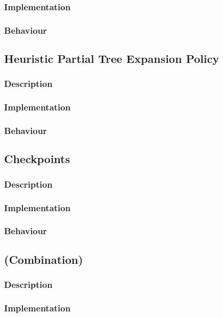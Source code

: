 \documentclass[10pt,a4paper]{article}
\begin{document}
\subsubsection{Implementation}
\subsubsection{Behaviour}
\subsection{Heuristic Partial Tree Expansion Policy}
\subsubsection{Description}
\subsubsection{Implementation}
\subsubsection{Behaviour}
\subsection{Checkpoints}
\subsubsection{Description}
\subsubsection{Implementation}
\subsubsection{Behaviour}
\subsection{(Combination)}
\subsubsection{Description}
\subsubsection{Implementation}
\end{document}
